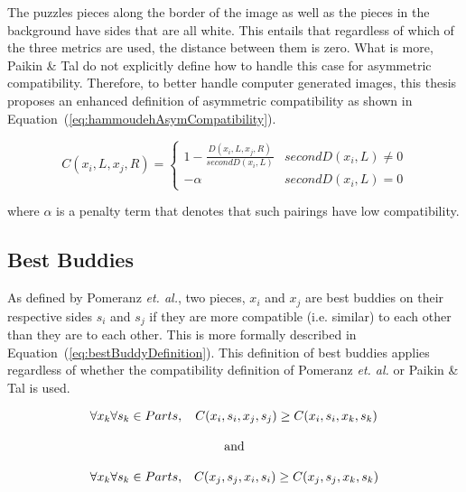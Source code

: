 \documentclass{report}
\def\eref#1{(\ref{#1})}
\begin{document}
The puzzles pieces along the border of the image as well as the pieces in the background have sides that are all white.  This entails that regardless of which of the three metrics are used, the distance between them is zero.  What is more, Paikin \& Tal do not explicitly define how to handle this case for asymmetric compatibility.  Therefore, to better handle computer generated images, this thesis proposes an enhanced definition of asymmetric compatibility as shown in Equation~\eref{eq:hammoudehAsymCompatibility}.  

\begin{equation} \label{eq:hammoudehAsymCompatibility}
C(x_i,L,x_j,R)= \begin{cases} 
	1 - \frac{D(x_i,L,x_j,R)}{secondD(x_i,L)} & secondD(x_i,L) \ne 0
\\
	-\alpha & secondD(x_i,L) = 0
\end{cases} 
\end{equation}

\noindent
where $\alpha$ is a penalty term that denotes that such pairings have low compatibility.


\subsection{Best Buddies}\label{sec:bestBuddies}

As defined by Pomeranz \textit{et. al.}, two pieces, $x_i$ and $x_j$ are best buddies on their respective sides $s_i$ and $s_j$ if they are more compatible (i.e. similar) to each other than they are to each other.  This is more formally described in Equation~\eref{eq:bestBuddyDefinition}.  This definition of best buddies applies regardless of whether the compatibility definition of Pomeranz \textit{et. al.} or Paikin \& Tal is used.

\begin{equation} \label{eq:bestBuddyDefinition}
\begin{split}
\begin{matrix}
\forall{x_k} \forall{s_k} \in Parts, & C(x_i, s_i, x_j, s_j) \geq C(x_i, s_i, x_k, s_k)
\\
\\
\multicolumn{2}{c}{\textnormal{and}}
\\
\\
\forall{x_k} \forall{s_k} \in Parts, & C(x_j, s_j, x_i, s_i) \geq C(x_j, s_j, x_k, s_k)
\end{matrix}
\end{split}
\end{equation}
\end{document}
